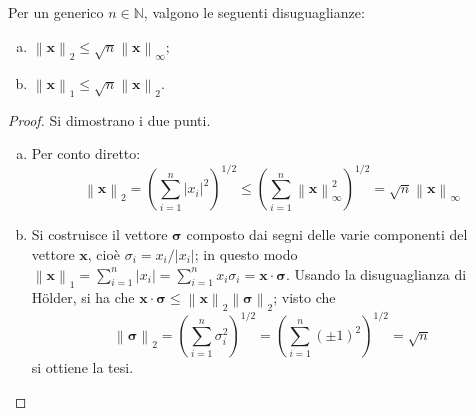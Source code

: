 \documentclass[11pt, a4paper]{scrartcl}
\theoremstyle{definition}
\numberwithin{esempio}{section}
\theoremstyle{definition}
\numberwithin{obs}{section}
\numberwithin{nota}{section}
\numberwithin{equation}{subsection}
\begin{document}
\begin{prop}
	{}{}
	Per un generico $n \in \mathbb{N}$, valgono le seguenti disuguaglianze:
	\begin{enumerate}[(a).]
		\item $\left\lVert \mathbf{x}  \right\rVert _2 \le \sqrt{n} \left\lVert \mathbf{x}  \right\rVert _\infty$;
		\item $\left\lVert \mathbf{x}  \right\rVert _1 \le \sqrt{n} \left\lVert \mathbf{x}  \right\rVert _2$.
	\end{enumerate}
	\begin{proof}
		Si dimostrano i due punti.
		\begin{enumerate}[(a).]
			\item Per conto diretto:
				\[
				\left\lVert \mathbf{x}  \right\rVert _2 = \left(\sum_{i=1}^{n} \lvert x_i \rvert ^2 \right) ^{1 / 2}  \le \left(\sum_{i=1}^{n} \left\lVert \mathbf{x}  \right\rVert _\infty^2\right) ^{1 / 2} = \sqrt{n} \left\lVert \mathbf{x}  \right\rVert _\infty
				\] 
			\item Si costruisce il vettore $\pmb{\sigma } $ composto dai segni delle varie componenti del vettore $\mathbf{x} $, cio\`e $\sigma _i = x_i / \lvert x_i \rvert $; in questo modo $\left\lVert \mathbf{x}  \right\rVert _1 = \sum_{i=1}^{n} \lvert x_i \rvert = \sum_{i=1}^{n} x_i \sigma _i = \mathbf{x}  \cdot \pmb{\sigma } $.
				Usando la disuguaglianza di H\"older, si ha che $\mathbf{x} \cdot \pmb{\sigma } \le \left\lVert \mathbf{x}  \right\rVert _2 \left\lVert \pmb{\sigma }  \right\rVert_2 $; visto che
				\[
				\left\lVert \pmb{\sigma }  \right\rVert _2 = \left(\sum_{i=1}^{n} \sigma _i^2\right) ^{1 / 2} = \left(\sum_{i=1}^{n} (\pm 1)^2 \right) ^{1 / 2} = \sqrt{n} 
				\] 
			si ottiene la tesi.	
		\end{enumerate}
	\end{proof}
\end{prop}
\end{document}

